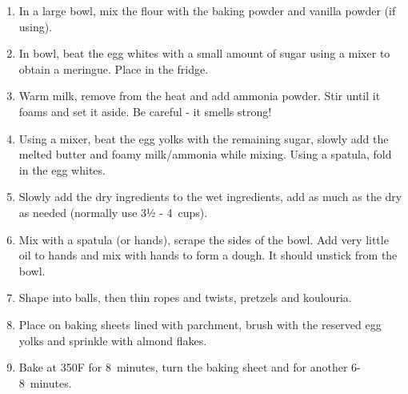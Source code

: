 \begin{enumerate}
    \item In a large bowl, mix the flour with the baking powder and vanilla powder (if using).
    \item In bowl, beat the egg whites with a small amount of sugar using a mixer to obtain a meringue. Place in the fridge.
    \item Warm milk, remove from the heat and add ammonia powder. Stir until it foams and set it aside. Be careful - it smells strong!
    \item Using a mixer, beat the egg yolks with the remaining sugar, slowly add the melted butter and foamy milk/ammonia while mixing. Using a spatula, fold in the egg whites.
    \item Slowly add the dry ingredients to the wet ingredients, add as much as the dry as needed (normally use 3½ - 4~cups).
    \item Mix with a spatula (or hands), scrape the sides of the bowl. Add very little oil to hands and mix with hands to form a dough. It should unstick from the bowl.
    \item Shape into balls, then thin ropes and twists, pretzels and koulouria.
    \item Place on baking sheets lined with parchment, brush with the reserved egg yolks and sprinkle with almond flakes.
    \item Bake at 350\degree F for 8~minutes, turn the baking sheet and for another 6-8~minutes.
\end{enumerate}

